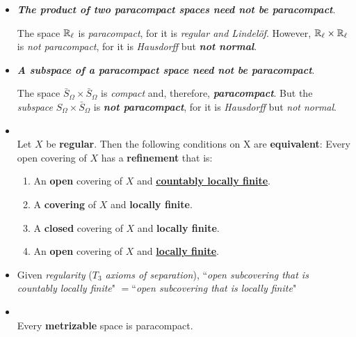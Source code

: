 \documentclass[11pt]{article}
\begin{document}
\begin{itemize}
\item \begin{remark} \emph{\textbf{The product of two paracompact spaces need not be paracompact}}. 

The space ${\mathbb R}_{\ell}$ is \emph{paracompact}, for it is \emph{regular and Lindel\"of}. However, ${\mathbb R}_{\ell} \times {\mathbb R}_{\ell}$ is \emph{not paracompact}, for it is \emph{Hausdorff} but \emph{\textbf{not normal}}.
\end{remark}

\item \begin{remark} \emph{\textbf{A subspace of a paracompact space need not be paracompact}}. 

The space $\bar{S}_{\Omega} \times \bar{S}_{\Omega}$ is \emph{compact} and, therefore, \emph{\textbf{paracompact}}. But the \emph{subspace} $S_{\Omega} \times \bar{S}_{\Omega}$ is \emph{\textbf{not paracompact}}, for it is \emph{Hausdorff} but \emph{not normal}.
\end{remark}

\item \begin{lemma} \citep{munkres2000topology}\\
Let $X$ be \textbf{regular}. Then the following conditions on X are \textbf{equivalent}:  
Every open covering of $X$ has a \textbf{refinement} that is:
\begin{enumerate}
\item An \textbf{open} covering of $X$ and \underline{\textbf{countably locally finite}}.
\item A \textbf{covering} of $X$ and \textbf{locally finite}.
\item A \textbf{closed} covering of $X$ and \textbf{locally finite}.
\item An \textbf{open} covering of $X$ and \underline{\textbf{locally finite}}.
\end{enumerate}
\end{lemma}

\item \begin{remark}
Given \emph{regularity} (\emph{$T_3$ axioms of separation}),  ``\emph{open subcovering that is countably locally finite}" $=$``\emph{open subcovering that is  locally finite}"
\end{remark}

\item \begin{theorem}\citep{munkres2000topology}\\
Every \textbf{metrizable} space is paracompact.
\end{theorem}


\end{itemize}
\end{document}
